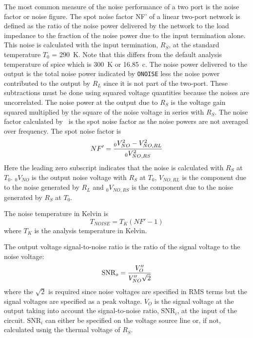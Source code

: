 The most common measure of the noise performance of a two port is the noise
factor or noise figure.  The spot noise factor {NF'}
of a linear two-port network
is defined as the ratio of the noise power delivered by the network to the 
load impedance to the fraction of the noise power due to the input
termination alone.   This noise is calculated with the input termination,
 $R_S$, at the standard temperature $T_0$ = 290~K.  Note that this differs
 from the default analysis temperature of spice which is 300~K or 16.85~c.
The noise power delivered to the output is the total noise power indicated
by {\tt ONOISE} less the noise power contributed to the output by $R_L$ since it
is not part of the two-port.  These subtractions must be done using squared
voltage quantities because the noises are uncorrelated.  The noise power at the output
due to $R_S$ is the voltage gain squared multiplied by the square of the noise
voltage in series with $R_S$.  The noise factor calculated by \sspice\ is
the spot noise factor as the noise powers are not averaged over
frequency.  The spot noise factor is
\begin{equation}
NF' = { { _0V_{NO}^2 - V_{NO,RL}^2 } \over {_0V_{NO,RS}^2} }
\end{equation}
Here the leading zero subscript indicates that the noise is calculated with
$R_S$ at $T_0$.
$_0V_{NO}$ is the output noise voltage with $R_S$ at $T_0$,
$V_{NO,RL}$ is the component due to the noise generated by $R_L$ and
$_0V_{NO,RS}$ is the component due to the noise generated by $R_S$ at
$T_0$.

The noise temperature in Kelvin is
\begin{equation}
T_{NOISE} = T_K (NF' -1)
\end{equation}
where $T_K$ is the analysis temperature in Kelvin.

The output voltage signal-to-noise ratio is the ratio of the signal voltage to
the noise voltage:
\begin{equation}
\mbox{SNR}_o = {{V''_O }\over{ V''_{NO} \sqrt{2}}}
\end{equation}
where the $\sqrt{2}$ is required since noise voltages are specified in RMS
terms but the signal voltages are specified as a peak voltage.
$V_O$ is the signal voltage at the output taking into account the
signal-to-noise ratio, $\mbox{SNR}_i$, at the input of the circuit.
$\mbox{SNR}_i$ can either be specified on the voltage source line or, if
not, calculated usnig the thermal voltage of $R_S$.


